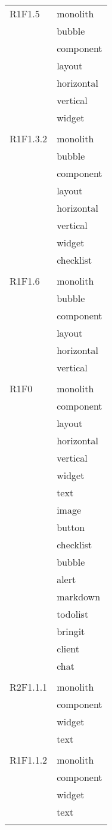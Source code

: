 \begin{center}
\begin{longtable}{|p{7cm}|p{7cm}|}
		R1F1.5 & monolith \\ & bubble \\ & component \\ & layout \\ & horizontal \\ & vertical \\ & widget \\ & \\ \hline
		R1F1.3.2 & monolith \\ & bubble \\ & component \\ & layout \\ & horizontal \\ & vertical \\ & widget \\ & checklist \\ & \\ \hline
		R1F1.6 & monolith \\ & bubble \\ & component \\ & layout \\ & horizontal \\ & vertical \\ & \\ \hline
		R1F0 & monolith \\ & component \\ & layout \\ & horizontal \\ & vertical \\ & widget \\ & text \\ & image \\ & button \\ & checklist \\ & bubble \\ & alert \\ & markdown \\ & todolist \\ & bringit \\ & client \\ & chat \\ & \\ \hline
		R2F1.1.1 & monolith \\ & component \\ & widget \\ & text \\ & \\ \hline
		R1F1.1.2 & monolith \\ & component \\ & widget \\ & text \\ & \\ \hline

\end{longtable}
\end{center}

